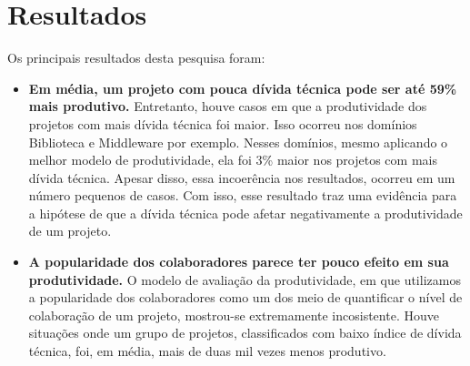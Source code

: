 \section{Resultados}

Os principais resultados desta pesquisa foram:

\begin{itemize}

\item \textbf{ Em média, um projeto com pouca dívida técnica pode ser até 59\% mais produtivo.}  Entretanto, houve casos em que a produtividade dos projetos com mais dívida técnica foi maior. Isso ocorreu nos domínios Biblioteca e Middleware por exemplo. Nesses domínios, mesmo aplicando o melhor modelo de produtividade, ela foi 3\% maior nos projetos com mais dívida técnica. Apesar disso, essa incoerência nos resultados, ocorreu em um número pequenos de casos. Com isso, esse resultado traz uma evidência para a hipótese de que a dívida técnica pode afetar negativamente a produtividade de um projeto. 


\item \textbf{A popularidade dos colaboradores parece ter pouco efeito em sua produtividade.} O modelo de avaliação da produtividade, em que utilizamos a popularidade dos colaboradores como um dos meio de quantificar o nível de colaboração de um projeto, mostrou-se extremamente incosistente. Houve situações onde um grupo de projetos, classificados com baixo índice de dívida técnica, foi, em média, mais de duas mil vezes menos produtivo. 


\end{itemize}
